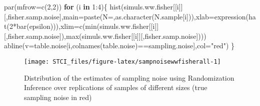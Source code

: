 \documentclass[
]{book}
\newenvironment{Shaded}{\begin{snugshade}}{\end{snugshade}}
\newcommand{\AttributeTok}[1]{\textcolor[rgb]{0.77,0.63,0.00}{#1}}
\newcommand{\ControlFlowTok}[1]{\textcolor[rgb]{0.13,0.29,0.53}{\textbf{#1}}}
\newcommand{\DecValTok}[1]{\textcolor[rgb]{0.00,0.00,0.81}{#1}}
\newcommand{\FunctionTok}[1]{\textcolor[rgb]{0.00,0.00,0.00}{#1}}
\newcommand{\NormalTok}[1]{#1}
\newcommand{\SpecialCharTok}[1]{\textcolor[rgb]{0.00,0.00,0.00}{#1}}
\newcommand{\StringTok}[1]{\textcolor[rgb]{0.31,0.60,0.02}{#1}}
\theoremstyle{definition}
\theoremstyle{definition}
\theoremstyle{definition}
\theoremstyle{definition}
\theoremstyle{remark}
\begin{document}
\begin{Shaded}
\begin{Highlighting}[]
\FunctionTok{par}\NormalTok{(}\AttributeTok{mfrow=}\FunctionTok{c}\NormalTok{(}\DecValTok{2}\NormalTok{,}\DecValTok{2}\NormalTok{))}
\ControlFlowTok{for}\NormalTok{ (i }\ControlFlowTok{in} \DecValTok{1}\SpecialCharTok{:}\DecValTok{4}\NormalTok{)\{}
  \FunctionTok{hist}\NormalTok{(simuls.ww.fisher[[i]][,}\StringTok{\textquotesingle{}fisher.samp.noise\textquotesingle{}}\NormalTok{],}\AttributeTok{main=}\FunctionTok{paste}\NormalTok{(}\StringTok{\textquotesingle{}N=\textquotesingle{}}\NormalTok{,}\FunctionTok{as.character}\NormalTok{(N.sample[i])),}\AttributeTok{xlab=}\FunctionTok{expression}\NormalTok{(}\FunctionTok{hat}\NormalTok{(}\DecValTok{2}\SpecialCharTok{*}\FunctionTok{bar}\NormalTok{(epsilon))),}\AttributeTok{xlim=}\FunctionTok{c}\NormalTok{(}\FunctionTok{min}\NormalTok{(simuls.ww.fisher[[i]][,}\StringTok{\textquotesingle{}fisher.samp.noise\textquotesingle{}}\NormalTok{]),}\FunctionTok{max}\NormalTok{(simuls.ww.fisher[[i]][,}\StringTok{\textquotesingle{}fisher.samp.noise\textquotesingle{}}\NormalTok{])))}
  \FunctionTok{abline}\NormalTok{(}\AttributeTok{v=}\NormalTok{table.noise[i,}\FunctionTok{colnames}\NormalTok{(table.noise)}\SpecialCharTok{==}\StringTok{\textquotesingle{}sampling.noise\textquotesingle{}}\NormalTok{],}\AttributeTok{col=}\StringTok{"red"}\NormalTok{)}
\NormalTok{\}}
\end{Highlighting}
\end{Shaded}

\begin{figure}[htbp]

{\centering \texttt{[image: STCI\_files/figure-latex/sampnoisewwfisherall-1]} 

}

\caption{Distribution of the estimates of sampling noise using Randomization Inference over replications of samples of different sizes (true sampling noise in red)}\label{fig:sampnoisewwfisherall}
\end{figure}
\end{document}
